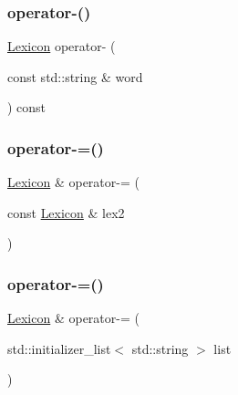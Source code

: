 \subsubsection{\texorpdfstring{operator-\/()}{operator-()}\hspace{0.1cm}{\footnotesize\ttfamily [3/3]}}
{\footnotesize\ttfamily \mbox{\hyperlink{classLexicon}{Lexicon}} operator-\/ (\begin{DoxyParamCaption}\item[{const std\+::string \&}]{word }\end{DoxyParamCaption}) const}

\mbox{\label{classLexicon_ac51e54102d6257c1a0a48c99ad2520f6}} 
\subsubsection{\texorpdfstring{operator-\/=()}{operator-=()}\hspace{0.1cm}{\footnotesize\ttfamily [1/3]}}
{\footnotesize\ttfamily \mbox{\hyperlink{classLexicon}{Lexicon}} \& operator-\/= (\begin{DoxyParamCaption}\item[{const \mbox{\hyperlink{classLexicon}{Lexicon}} \&}]{lex2 }\end{DoxyParamCaption})}

\mbox{\label{classLexicon_a1b3ac9124341c069a604d760190789b1}} 
\subsubsection{\texorpdfstring{operator-\/=()}{operator-=()}\hspace{0.1cm}{\footnotesize\ttfamily [2/3]}}
{\footnotesize\ttfamily \mbox{\hyperlink{classLexicon}{Lexicon}} \& operator-\/= (\begin{DoxyParamCaption}\item[{std\+::initializer\+\_\+list$<$ std\+::string $>$}]{list }\end{DoxyParamCaption})}

\mbox{\label{classLexicon_a4acb1cafdecdbf77b1d62f2372a6d244}} 
